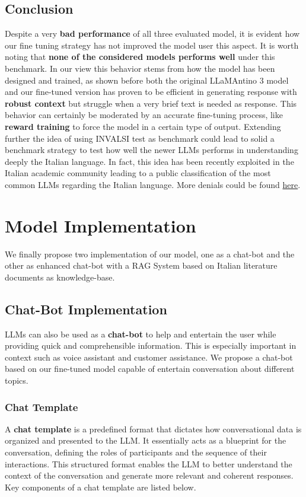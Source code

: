 \documentclass{article}
\begin{document}
	\subsection{Conclusion}
	Despite a very \textbf{bad performance} of all three evaluated model, it is evident how our fine tuning strategy has not improved the model user this aspect. It is worth noting that \textbf{none of the considered models performs well} under this benchmark.
	In our view this behavior stems from how the model has been designed and trained, as shown before both the original LLaMAntino 3 model and our fine-tuned version has proven to be efficient in generating response with \textbf{robust context} but struggle when a very brief text is needed as response.
	This behavior can certainly be moderated by an accurate fine-tuning process, like \textbf{reward training} to force the model in a certain type of output. 
	Extending further the idea of using INVALSI test as benchmark could lead to solid a benchmark strategy to test how well the newer LLMs performs in understanding deeply the Italian language. 
	In fact, this idea has been recently exploited in the Italian academic community leading to a public classification of the most common LLMs regarding the Italian language. More denials could be found \href{https://huggingface.co/spaces/Crisp-Unimib/INVALSIbenchmark}{here}.  
	
	
	\section{Model Implementation}
	We finally propose two implementation of our model, one as a chat-bot and the other as enhanced chat-bot with a RAG System based on Italian literature documents as knowledge-base.  
	
	\subsection{Chat-Bot Implementation}
	LLMs can also be used as a \textbf{chat-bot} to help and entertain the user while providing quick and comprehensible information. This is especially important in context such as voice assistant and customer assistance. We propose a chat-bot based on our fine-tuned model capable of entertain conversation about different topics. 
	
	\subsubsection{Chat Template}
	A \textbf{chat template} is a predefined format that dictates how conversational data is organized and presented to the LLM. It essentially acts as a blueprint for the conversation, defining the roles of participants and the sequence of their interactions. This structured format enables the LLM to better understand the context of the conversation and generate more relevant and coherent responses. Key components of a chat template are listed below.
	
\end{document}

